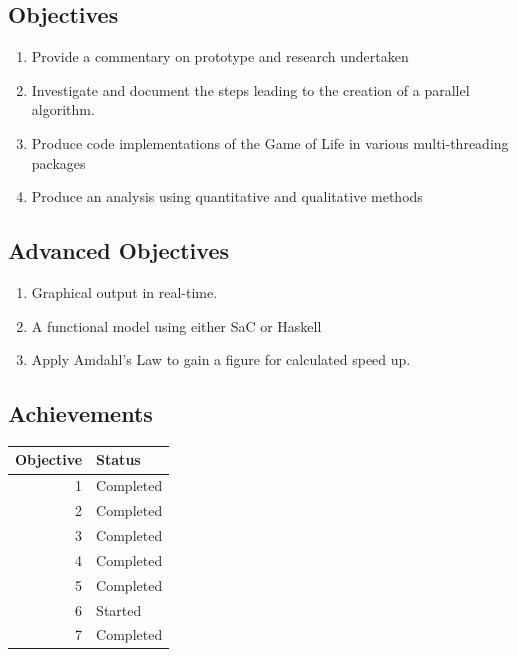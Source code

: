 \documentclass[11pt]{article} %
\begin{document}
\subsection*{Objectives}
\begin{enumerate}
\item Provide a commentary on prototype and research undertaken
\item Investigate and document the steps leading to the creation of a parallel algorithm.
\item Produce code implementations of the Game of Life in various multi-threading packages
\item Produce an analysis using quantitative and qualitative methods
\setcounter{saveenum}{\value{enumi}}
\end{enumerate}
\subsection*{Advanced Objectives}
\begin{enumerate}
\setcounter{enumi}{\value{saveenum}}
\item Graphical output in real-time.
\item A functional model using either SaC or Haskell
\item Apply Amdahl's Law to gain a figure for calculated speed up.
\end{enumerate}
\pagebreak
\subsection*{Achievements}

\begin{table}[hf]
\centering
\begin{tabular}{|r|l|}
\hline {\bf Objective} & {\bf Status} \\ 
\hline 1 &  Completed\\ 
\hline 2 &  Completed\\ 
\hline 3 &  Completed\\ 
\hline 4 &  Completed\\ 
\hline 
\hline 5 &  Completed\\ 
\hline 6 &  Started \\ 
\hline 7 &  Completed\\ 
\hline 
\end{tabular} 
\end{table}
\end{document}

